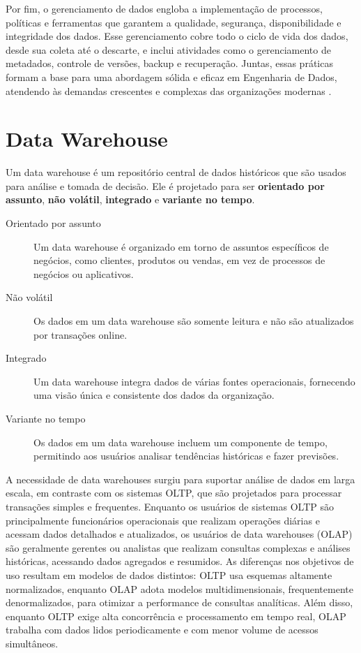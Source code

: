 Por fim, o gerenciamento de dados engloba a implementação de processos, políticas e ferramentas que garantem a 
qualidade, segurança, disponibilidade e integridade dos dados. Esse gerenciamento cobre todo o ciclo de vida dos 
dados, desde sua coleta até o descarte, e inclui atividades como o gerenciamento de metadados, controle de versões, 
backup e recuperação. Juntas, essas práticas formam a base para uma abordagem sólida e eficaz em Engenharia de Dados, 
atendendo às demandas crescentes e complexas das organizações modernas \cite{jahnke2012problem}.

\section{Data Warehouse}

Um data warehouse é um repositório central de dados históricos que são usados para análise e tomada de decisão. Ele 
é projetado para ser \textbf{orientado por assunto}, \textbf{não volátil}, \textbf{integrado} e \textbf{variante no tempo}.
\begin{description} 
    \item[Orientado por assunto] Um data warehouse é organizado em torno de assuntos específicos de negócios, como clientes, produtos ou vendas, em vez de processos de negócios ou aplicativos.
    \item[Não volátil] Os dados em um data warehouse são somente leitura e não são atualizados por transações online.
    \item[Integrado] Um data warehouse integra dados de várias fontes operacionais, fornecendo uma visão única e consistente dos dados da organização.
    \item[Variante no tempo] Os dados em um data warehouse incluem um componente de tempo, permitindo aos usuários analisar tendências históricas e fazer previsões.
\end{description}
A necessidade de data warehouses surgiu para suportar análise de dados em larga escala, em contraste com os sistemas 
OLTP, que são projetados para processar transações simples e frequentes. Enquanto os usuários de sistemas OLTP são 
principalmente funcionários operacionais que realizam operações diárias e acessam dados detalhados e atualizados, 
os usuários de data warehouses (OLAP) são geralmente gerentes ou analistas que realizam consultas complexas e análises 
históricas, acessando dados agregados e resumidos. As diferenças nos objetivos de uso resultam em modelos de dados 
distintos: OLTP usa esquemas altamente normalizados, enquanto OLAP adota modelos multidimensionais, frequentemente 
denormalizados, para otimizar a performance de consultas analíticas. Além disso, enquanto OLTP exige alta concorrência 
e processamento em tempo real, OLAP trabalha com dados lidos periodicamente e com menor volume de acessos simultâneos.

